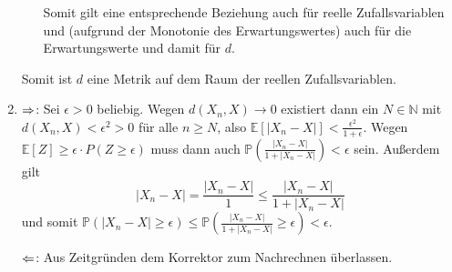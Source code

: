 \documentclass[a4paper]{article}
\begin{document}
\begin{enumerate}[label=(\alph*)]
\begin{enumerate}[label=(\roman*)]
        Somit gilt eine entsprechende Beziehung auch für reelle Zufallsvariablen und (aufgrund der Monotonie des Erwartungswertes) auch für die Erwartungswerte und damit für $d$.
    \end{enumerate}
    Somit ist $d$ eine Metrik auf dem Raum der reellen Zufallsvariablen.
    \item $\Rightarrow$: Sei $\epsilon > 0$ beliebig.
    Wegen $d(X_n, X) \to 0$ existiert dann ein $N \in \mathds{N}$ mit $d(X_n, X) < \epsilon^2 > 0$ für alle $n \geq N$, also $\mathds{E}\left[ |X_n-X| \right] < \frac{\epsilon^2}{1 + \epsilon}$.
    Wegen $\mathds{E}[Z] \geq \epsilon \cdot P(Z \geq \epsilon)$ muss dann auch $\mathds{P}\left(\frac{|X_n-X|}{1 + |X_n - X|}\right) < \epsilon$ sein.
    Außerdem gilt
    \begin{equation*}
        |X_n - X| = \frac{|X_n - X|}{1} \leq \frac{|X_n-X|}{1+|X_n-X|}
    \end{equation*}
    und somit $\mathds{P}(|X_n - X| \geq \epsilon) \leq \mathds{P}\left(\frac{|X_n-X|}{1 + |X_n - X|}\geq \epsilon \right) < \epsilon$.
    
    $\Leftarrow$: Aus Zeitgründen dem Korrektor zum Nachrechnen überlassen.

\end{enumerate}
\end{document}

